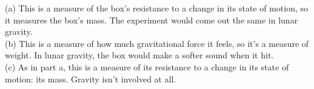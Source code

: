 (a) This is a measure of the box's resistance to a change in its state of
motion, so it measures the box's mass. The experiment would come out the same
in lunar gravity.\\
(b) This is a measure of how much gravitational force it feels, so it's a measure
of weight. In lunar gravity, the box would make a softer sound when it hit.\\
(c) As in part a, this is a measure of its resistance to a change in its state
of motion: its mass. Gravity isn't involved at all.



